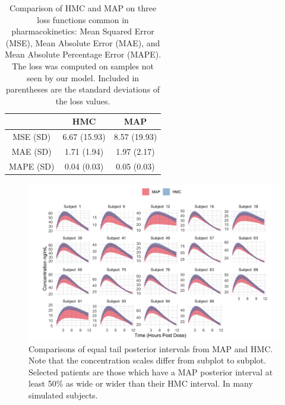 \begin{table}
	\centering
\begin{tabular}{|c|c|c|}
	\hline 
	& HMC & MAP \\ 
	\hline 
	MSE (SD) & 6.67 (15.93) & 8.57 (19.93) \\ 
	\hline 
	MAE (SD) & 1.71 (1.94) & 1.97 (2.17) \\ 
	\hline 
	MAPE (SD) & 0.04 (0.03) & 0.05 (0.03)\\ 
	\hline 
\end{tabular} 
\caption{Comparison of HMC and MAP on three loss functions common in pharmacokinetics:  Mean Squared Error (MSE), Mean Absolute Error (MAE), and Mean Absolute Percentage Error (MAPE).  The loss was computed on samples not seen by our model.  Included in parentheses are the standard deviations of the loss values.}
\end{table}

\clearpage
\begin{figure}
\centering
	\includegraphics[width=1\linewidth]{figs/intervals}
	\caption{Comparisons of equal tail posterior intervals from MAP and HMC. Note that the concentration scales differ from subplot to subplot.  Selected patients are those which have a MAP posterior interval at least 50\% as wide or wider than their HMC interval.  In many simulated subjects.}
	\label{fig:fig6}
\end{figure}
\clearpage


